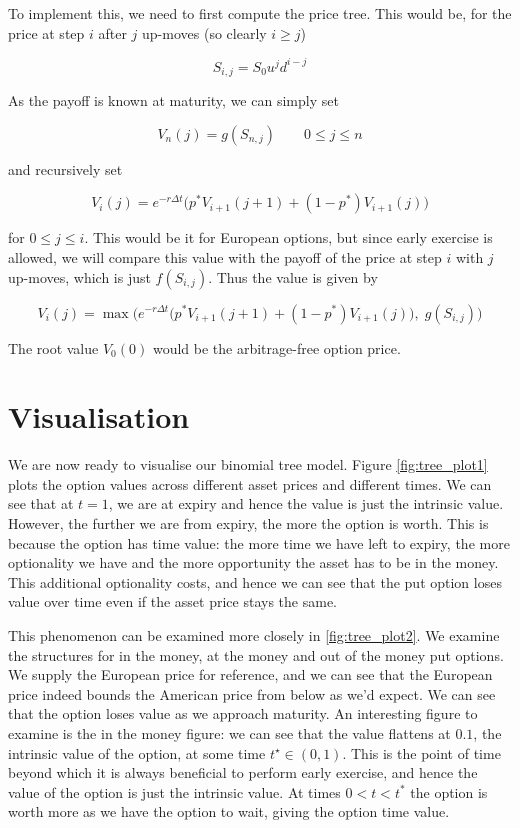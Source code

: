 To implement this, we need to first compute the price tree. This would be, for the price at step $i$ after $j$ up-moves (so clearly $i \ge j$)

$$
S_{i, j} = S_0 u^j d^{i-j}
$$

As the payoff is known at maturity, we can simply set

$$
V_n(j) = g(S_{n, j}) \qquad 0 \le j \le n
$$

and recursively set

$$
V_i(j) = e^{-r\Delta t} \big(p^* V_{i+1}(j+1) + (1-p^*)V_{i+1}(j)\big)
$$

for $0 \le j \le i$. This would be it for European options, but since early exercise is allowed, we will compare this value with the payoff of the price at step $i$ with $j$ up-moves, which is just $f(S_{i, j})$. Thus the value is given by

$$
V_i(j) = \max\bigg(e^{-r\Delta t} \big(p^* V_{i+1}(j+1) + (1-p^*)V_{i+1}(j)\big), \; g(S_{i, j})\bigg)
$$

The root value $V_0(0)$ would be the arbitrage-free option price.

\section{Visualisation}

We are now ready to visualise our binomial tree model. Figure \ref{fig:tree_plot1} plots the option values across different asset prices and different times. We can see that at $t=1$, we are at expiry and hence the value is just the intrinsic value. However, the further we are from expiry, the more the option is worth. This is because the option has time value: the more time we have left to expiry, the more optionality we have and the more opportunity the asset has to be in the money. This additional optionality costs, and hence we can see that the put option loses value over time even if the asset price stays the same.

This phenomenon can be examined more closely in \ref{fig:tree_plot2}. We examine the structures for in the money, at the money and out of the money put options. We supply the European price for reference, and we can see that the European price indeed bounds the American price from below as we'd expect. We can see that the option loses value as we approach maturity. An interesting figure to examine is the in the money figure: we can see that the value flattens at $0.1$, the intrinsic value of the option, at some time $t^\star \in (0, 1)$. This is the point of time beyond which it is always beneficial to perform early exercise, and hence the value of the option is just the intrinsic value. At times $0<t < t^*$ the option is worth more as we have the option to wait, giving the option time value.

